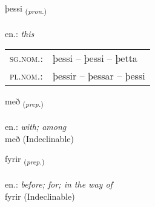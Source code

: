 \documentclass[frontgrid, backgrid]{flacards}\usepackage[]{graphicx}\usepackage[]{xcolor}
\begin{document}
{þessi \small{\textsubscript{(\textit{pron.})}} \\[1ex] %
\textphonetic{[θɛsɪ]} \\
en.: \emph{this} \\  [2ex]
\renewcommand*{\arraystretch}{0.8}
\begin{tabular}{ll}
\textsc{sg.nom.}: & þessi  --  þessi -- þetta \\ 
\textsc{pl.nom.}: & þessir -- þessar -- þessi
\end{tabular}
}


\renewcommand{\flhead}{\vskip5pt \fboxsep=0pt {\small\bfseries\footnotesize Forsetning | Preposition}}
\renewcommand{\fcfoot}{\vskip5pt \fboxsep=0pt \hspace{2pt}{\small\bfseries\footnotesize 1K}}

\renewcommand{\blhead}{\vskip5pt {\small\bfseries\footnotesize Forsetning | Preposition }}
\renewcommand{\bcfoot}{\vskip5pt \hspace{2pt}{\small\bfseries\footnotesize 1K}}


{með \small{\textsubscript{(\textit{prep.})}} \\[1ex]
\textphonetic{[mɛːð]} \\
en.: \emph{with; among} \\  [2ex]
með (Indeclinable)}


\renewcommand{\flhead}{\vskip5pt \fboxsep=0pt {\small\bfseries\footnotesize Forsetning | Preposition}}
\renewcommand{\fcfoot}{\vskip5pt \fboxsep=0pt \hspace{2pt}{\small\bfseries\footnotesize 1K}}

\renewcommand{\blhead}{\vskip5pt {\small\bfseries\footnotesize Forsetning | Preposition }}
\renewcommand{\bcfoot}{\vskip5pt \hspace{2pt}{\small\bfseries\footnotesize 1K}}


{fyrir \small{\textsubscript{(\textit{prep.})}} \\[1ex]
\textphonetic{[fɪːrɪr]} \\
en.: \emph{before; for; in the way of} \\  [2ex]
fyrir (Indeclinable)}
\end{document}
